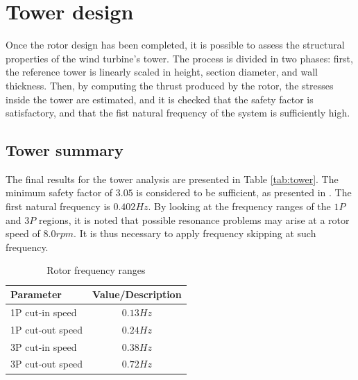 \section{Tower design}

Once the rotor design has been completed, it is possible to assess the structural properties of the wind turbine's tower. The process is divided in two phases: first, the reference tower is linearly scaled in height, section diameter, and wall thickness. Then, by computing the thrust produced by the rotor, the stresses inside the tower are estimated, and it is checked that the safety factor is satisfactory, and that the fist natural frequency of the system is sufficiently high.

\subsection{Tower summary}

The final results for the tower analysis are presented in Table \ref{tab:tower}. The minimum safety factor of $3.05$ is considered to be sufficient, as presented in \cite{NREL_tower}.
The first natural frequency is $0.402Hz$. By looking at the frequency ranges of the $1P$ and $3P$ regions, it is noted that possible resonance problems may arise at a rotor speed of $8.0 rpm$. It is thus necessary to apply frequency skipping at such frequency.

\begin{table}[H]
\begin{center} 
\caption{Rotor frequency ranges}\label{tab:freq_ranges}
\begin{tabular}{ |l|c| } 
\hline
\textbf{Parameter} & \textbf{Value/Description}  \\ 
\hline
1P cut-in speed & $0.13 Hz$ \\ 
\hline
1P cut-out speed & $0.24 Hz$ \\ 
\hline
3P cut-in speed & $0.38 Hz$ \\ 
\hline
3P cut-out speed & $0.72 Hz$ \\ 
\hline
\end{tabular} \\
\end{center}
\end{table}


